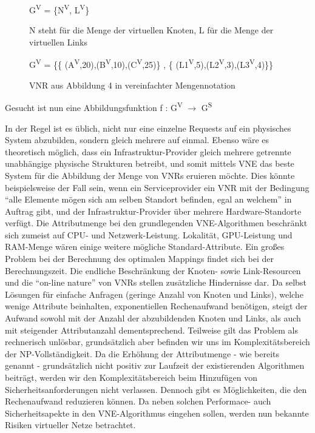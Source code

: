 \documentclass{lni}
\begin{document}
\begin{figure}[htb]
\begin{center}
G\textsuperscript{V} = \{N\textsuperscript{V}, L\textsuperscript{V}\}
\caption{\label{graph5}N steht für die Menge der virtuellen Knoten, L für die Menge der virtuellen Links}
\end{center}
\end{figure}

\begin{figure}[htb]
\begin{center}
G\textsuperscript{V} = \{\{
(A\textsuperscript{V},20),(B\textsuperscript{V},10),(C\textsuperscript{V},25)\} , \{
(L1\textsuperscript{V},5),(L2\textsuperscript{V},3),(L3\textsuperscript{V},4)\}\}
\caption{\label{graph6}VNR aus Abbildung 4 in vereinfachter Mengennotation}
\end{center}
\end{figure}


Gesucht ist nun eine Abbildungsfunktion f : G\textsuperscript{V} $\rightarrow$ G\textsuperscript{S}


In der Regel ist es üblich, nicht nur eine einzelne Requests auf ein physisches System abzubilden, sondern gleich mehrere auf einmal. Ebenso wäre es theoretisch möglich, dass ein Infrastruktur-Provider gleich mehrere getrennte unabhängige physische Strukturen betreibt, und somit mittels VNE das beste System für die Abbildung der Menge von VNRs eruieren möchte. Dies könnte beispielsweise der Fall sein, wenn ein Serviceprovider ein VNR mit der Bedingung "`alle Elemente mögen sich am selben Standort befinden, egal an welchem"' in Auftrag gibt, und der Infrastruktur-Provider über mehrere Hardware-Standorte verfügt.
\newline
Die Attributmenge bei den grundlegenden VNE-Algorithmen beschränkt  sich zumeist auf CPU- und Netzwerk-Leistung. 
Lokalität, GPU-Leistung und RAM-Menge wären einige weitere mögliche Standard-Attribute. Ein großes Problem bei der Berechnung des optimalen Mappings findet sich bei der Berechnungszeit. Die endliche Beschränkung der Knoten- sowie Link-Resourcen und die "`on-line nature"' von VNRs stellen zusätzliche Hindernisse dar. Da selbst Lösungen für einfache Anfragen (geringe Anzahl von Knoten und Links), welche wenige Attribute beinhalten, exponentiellen Rechenaufwand benötigen, steigt der Aufwand sowohl mit der Anzahl der abzubildenden Knoten und Links, als auch mit steigender Attributanzahl dementsprechend. Teilweise gilt das Problem als rechnerisch unlösbar, grundsätzlich aber befinden wir uns im Komplexitätsbereich der NP-Vollständigkeit. \cite{SVNE2} Da die Erhöhung der Attributmenge - wie bereits genannt - grundsätzlich nicht positiv zur Laufzeit der existierenden Algorithmen beiträgt, werden wir den Komplexitätsbereich beim Hinzufügen von Sicherheitsanforderungen nicht verlassen. Dennoch gibt es Möglichkeiten, die den Rechenaufwand reduzieren können. Da neben solchen Performace- auch Sicherheitsapekte in den VNE-Algorithmus eingehen sollen, werden nun bekannte Risiken virtueller Netze betrachtet.
\end{document}
